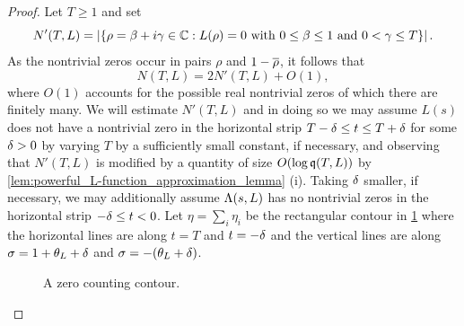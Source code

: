     \begin{proof}
      Let \(T \ge 1\) and set
      \[
        N'(T,L) = \left|\{\rho = \beta+i\gamma \in \mathbb{C}:L(\rho) = 0 \text{ with } 0 \le \beta \le 1 \text{ and } 0 < \gamma \le T\}\right|.
      \]
      As the nontrivial zeros occur in pairs \(\rho\) and \(1-\overline{\rho}\), it follows that
      \[
        N(T,L) = 2N'(T,L)+O(1),
      \]
      where \(O(1)\) accounts for the possible real nontrivial zeros of which there are finitely many. We will estimate \(N'(T,L)\) and in doing so we may assume \(L(s)\) does not have a nontrivial zero in the horizontal strip \(T-\delta \le t \le T+\delta\) for some \(\delta > 0\) by varying \(T\) by a sufficiently small constant, if necessary, and observing that \(N'(T,L)\) is modified by a quantity of size \(O(\log{\mathfrak{q}(T,L)})\) by \cref{lem:powerful_L-function_approximation_lemma} (i). Taking \(\delta\) smaller, if necessary, we may additionally assume \(\Lambda(s,L)\) has no nontrivial zeros in the horizontal strip \(-\delta \le t < 0\). Let \(\eta = \sum_{i}\eta_{i}\) be the rectangular contour in \cref{fig:zero_counting_contour} where the horizontal lines are along \(t = T\) and \(t = -\delta\) and the vertical lines are along \(\sigma = 1+\theta_{L}+\delta\) and \(\sigma = -(\theta_{L}+\delta)\).

      \begin{figure}[ht]
        \centering
        \caption{A zero counting contour.}
        \label{fig:zero_counting_contour}
      \end{figure}
      

\end{proof}
